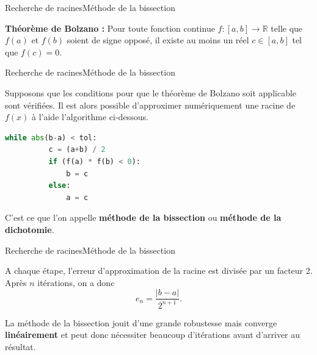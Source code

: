 \documentclass[usenames,dvipsnames,svgnames,10pt,aspectratio=169]{beamer}
\begin{document}
\begin{frame}[t, c]{Recherche de racines}{Méthode de la bissection}
  \begin{minipage}{.68\textwidth}
    \textbf{Théorème de Bolzano :} Pour toute fonction continue $f : \left[a, b \right] \to \mathbb{R}$ telle que $f(a)$ et $f(b)$ soient de signe opposé, il existe au moins un réel $c \in \left[a, b\right]$ tel que $f(c) = 0$.
  \end{minipage}%
  \hfill
  \begin{minipage}{.28\textwidth}
  \end{minipage}
\end{frame}

\begin{frame}[t, c, fragile]{Recherche de racines}{Méthode de la bissection}
  \begin{minipage}{.68\textwidth}
    Supposons que les conditions pour que le théorème de Bolzano soit applicable sont vérifiées.
    Il est alors possible d'approximer numériquement une racine de $f(x)$ à l'aide l'algorithme ci-dessous.

    \bigskip

    \begin{lstlisting}[language=Python]
      while abs(b-a) < tol:
          c = (a+b) / 2
          if (f(a) * f(b) < 0):
              b = c
          else:
              a = c
    \end{lstlisting}

    C'est ce que l'on appelle \textbf{\alert{méthode de la bissection}} ou \textbf{\alert{méthode de la dichotomie}}.
  \end{minipage}%
  \hfill
  \begin{minipage}{.28\textwidth}
  \end{minipage}
\end{frame}

\begin{frame}[t, c]{Recherche de racines}{Méthode de la bissection}
  \begin{minipage}{.68\textwidth}
    A chaque étape, l'erreur d'approximation de la racine est divisée par un facteur 2.
    Après $n$ itérations, on a donc
    \[
    e_n = \dfrac{\vert b - a \vert}{2^{n+1}}.
    \]

    \bigskip

    La méthode de la bissection jouit d'une grande robustesse mais converge \textbf{\alert{linéairement}} et peut donc nécessiter beaucoup d'itérations avant d'arriver au résultat.
    
  \end{minipage}%
  \hfill
  \begin{minipage}{.28\textwidth}
  \end{minipage}
\end{frame}
\end{document}
